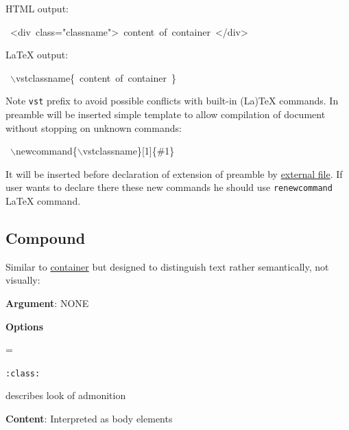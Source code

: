 \documentclass[12pt]{article}
\newenvironment{deflist}[1]{%
\begin{list}{}
{\renewcommand{\makelabel}[1]{\textbf{##1}\hfill}
\settowidth{\labelwidth}{\textbf{#1}}
\leftmargin=\labelwidth
\advance \leftmargin\labelsep}}
{\end{list}}
\newcommand{\vstvstcompound}[1]{#1}
\begin{document}
HTML output:

\begin{ttfamily}\begin{flushleft}
\mbox{~<div~class="classname">~content~of~container~</div>}\\
\end{flushleft}\end{ttfamily}

\LaTeX{} output:

\begin{ttfamily}\begin{flushleft}
\mbox{~$\backslash$vstclassname\{~content~of~container~\}}\\
\end{flushleft}\end{ttfamily}

Note \texttt{vst} prefix to avoid possible conflicts with built-in (La)\TeX{}
commands. In preamble will be inserted simple template to allow compilation of
document without stopping on unknown commands:

\begin{ttfamily}\begin{flushleft}
\mbox{~$\backslash$newcommand\{$\backslash$vstclassname\}[1]\{\#1\}}\\
\end{flushleft}\end{ttfamily}

It will be inserted before declaration of extension of preamble by \href{\#lvtp}{external
file}. If user wants to declare there these new commands he should
use \texttt{renewcommand} \LaTeX{} command.

\hypertarget{lcompound}{}
\subsection{Compound}

Similar to \href{\#lcontainer}{container} but designed to distinguish text rather semantically, not
visually:

 \vstvstcompound{}
\begin{itemize}
\item
\textbf{Argument}: NONE

\item
\textbf{Options}

 \begin{deflist}{iii}

\item[ \texttt{:class:}]

describes look of admonition
\end{deflist}

\item
\textbf{Content}: Interpreted as body elements
\end{itemize}
\hypertarget{lclass}{}
\end{document}
